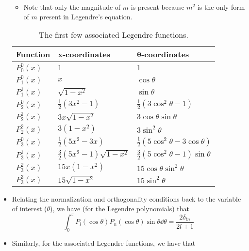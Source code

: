 \documentclass[../notes.tex]{subfiles}
\begin{document}
\begin{itemize}
    \begin{itemize}
        \item Note that only the magnitude of $m$ is present because $m^2$ is the only form of $m$ present in Legendre's equation.
    \end{itemize}
    \begin{table}[h!]
        \centering
        \small
        \renewcommand{\arraystretch}{1.4}
        \begin{tabular}{lll}
            \toprule
            \textbf{Function} & \textbf{$\bm{x}$-coordinates} & \textbf{$\bm{\theta}$-coordinates}\\
            \midrule
            $P_0^0(x)$ & $1$ & $1$\\
            $P_1^0(x)$ & $x$ & $\cos\theta$\\
            $P_1^1(x)$ & $\sqrt{1-x^2}$ & $\sin\theta$\\
            $P_2^0(x)$ & $\frac{1}{2}(3x^2-1)$ & $\frac{1}{2}(3\cos^2\theta-1)$\\
            $P_2^1(x)$ & $3x\sqrt{1-x^2}$ & $3\cos\theta\sin\theta$\\
            $P_2^2(x)$ & $3(1-x^2)$ & $3\sin^2\theta$\\
            $P_3^0(x)$ & $\frac{1}{2}(5x^2-3x)$ & $\frac{1}{2}(5\cos^2\theta-3\cos\theta)$\\
            $P_3^1(x)$ & $\frac{3}{2}(5x^2-1)\sqrt{1-x^2}$ & $\frac{3}{2}(5\cos^2\theta-1)\sin\theta$\\
            $P_3^2(x)$ & $15x(1-x^2)$ & $15\cos\theta\sin^2\theta$\\
            $P_3^3(x)$ & $15\sqrt{1-x^2}$ & $15\sin^2\theta$\\
            \bottomrule
        \end{tabular}
        \caption{The first few associated Legendre functions.}
        \label{tab:associatedLegendreFunctions}
    \end{table}
    \item Relating the normalization and orthogonality conditions back to the variable of interest ($\theta$), we have (for the Legendre polynomials) that
    \begin{equation*}
        \int_0^\pi P_l(\cos\theta)P_n(\cos\theta)\sin\theta\dd{\theta} = \frac{2\delta_{ln}}{2l+1}
    \end{equation*}
    \item Similarly, for the associated Legendre functions, we have that
    \begin{equation*}

\end{equation*}
\end{itemize}
\end{document}
